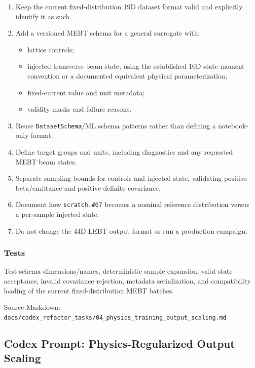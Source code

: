 \documentclass[
]{article}
\providecommand{\tightlist}{%
  \setlength{\itemsep}{0pt}\setlength{\parskip}{0pt}}
\begin{document}
\begin{enumerate}
\def\labelenumi{\arabic{enumi}.}
\tightlist
\item
  Keep the current fixed-distribution 19D dataset format valid and
  explicitly identify it as such.
\item
  Add a versioned MEBT schema for a general surrogate with:

  \begin{itemize}
  \tightlist
  \item
    lattice controls;
  \item
    injected transverse beam state, using the established 10D
    state-moment convention or a documented equivalent physical
    parameterization;
  \item
    fixed-current value and unit metadata;
  \item
    validity masks and failure reasons.
  \end{itemize}
\item
  Reuse \texttt{DatasetSchema}/ML schema patterns rather than defining a
  notebook-only format.
\item
  Define target groups and units, including diagnostics and any
  requested MEBT beam states.
\item
  Separate sampling bounds for controls and injected state, validating
  positive beta/emittance and positive-definite covariance.
\item
  Document how \texttt{scratch.\#07} becomes a nominal reference
  distribution versus a per-sample injected state.
\item
  Do not change the 44D LEBT output format or run a production campaign.
\end{enumerate}

\hypertarget{tests-2}{%
\subsubsection{Tests}\label{tests-2}}

Test schema dimensions/names, deterministic sample expansion, valid
state acceptance, invalid covariance rejection, metadata serialization,
and compatibility loading of the current fixed-distribution MEBT
batches.

Source Markdown:
\texttt{docs/codex\_refactor\_tasks/04\_physics\_training\_output\_scaling.md}

\hypertarget{codex-prompt-physics-regularized-output-scaling}{%
\subsection{Codex Prompt: Physics-Regularized Output
Scaling}\label{codex-prompt-physics-regularized-output-scaling}}
\end{document}
